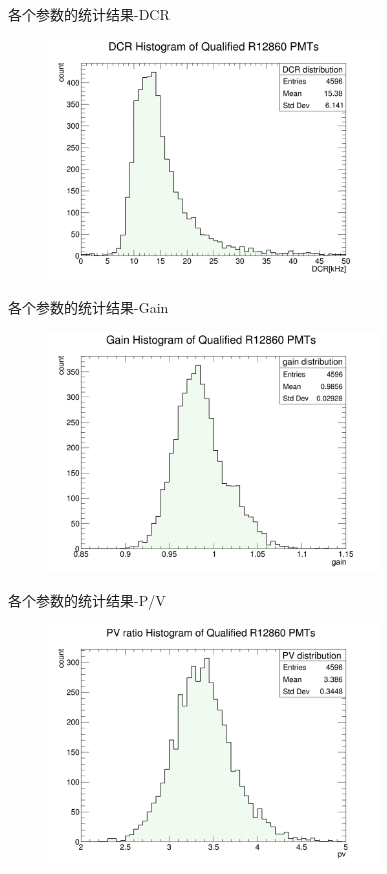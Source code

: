 \begin{frame}{各个参数的统计结果-DCR}
\begin{figure}
\centering
\includegraphics[width=0.78\textwidth]{figures/dcr.png}
\end{figure}
\end{frame}
\begin{frame}{各个参数的统计结果-Gain}
\begin{figure}
\centering
\includegraphics[width=0.78\textwidth]{figures/gain.png}
\end{figure}
\end{frame}
\begin{frame}{各个参数的统计结果-P/V}
\begin{figure}
\centering
\includegraphics[width=0.78\textwidth]{figures/pv.png}
\end{figure}
\end{frame}
